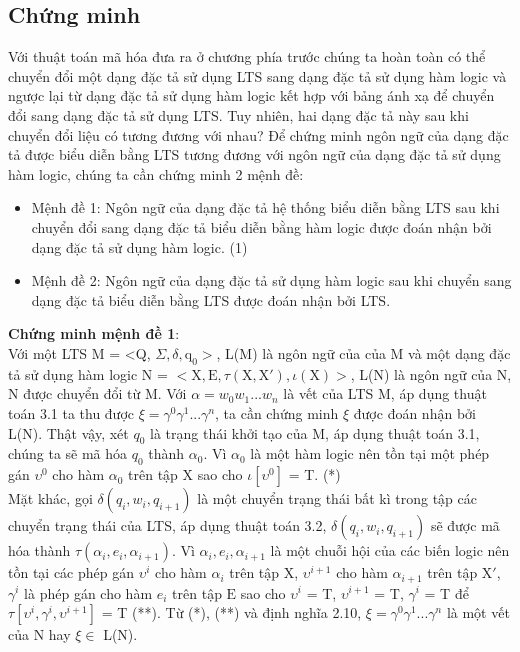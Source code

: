 \documentclass[a4paper,13pt,oneside,openany]{book}
\begin{document}
\begin{flushleft}
		\section{Chứng minh}
		Với thuật toán mã hóa đưa ra ở chương phía trước chúng ta hoàn toàn có thể chuyển đổi một dạng đặc tả sử dụng LTS sang dạng đặc tả sử dụng hàm logic và ngược lại từ dạng đặc tả sử dụng hàm logic kết hợp với bảng ánh xạ để chuyển đổi sang dạng đặc tả sử dụng LTS. Tuy nhiên, hai dạng đặc tả này sau khi chuyển đổi liệu có tương đương với nhau?
		Để chứng minh ngôn ngữ của dạng đặc tả được biểu diễn bằng LTS tương đương với ngôn ngữ của dạng đặc tả sử dụng hàm logic, chúng ta cần chứng minh 2 mệnh đề:
		\begin{itemize}
			\item Mệnh đề 1: Ngôn ngữ của dạng đặc tả hệ thống biểu diễn bằng LTS sau khi chuyển đổi sang dạng đặc tả biểu diễn bằng hàm logic được đoán nhận bởi dạng đặc tả sử dụng hàm logic. (1)\\
			\item Mệnh đề 2: Ngôn ngữ của dạng đặc tả sử dụng hàm logic sau khi chuyển sang dạng đặc tả biểu diễn bằng LTS được đoán nhận bởi LTS.
		\end{itemize}
		\textbf{Chứng minh mệnh đề 1}:\\
		Với một LTS M = <Q, $\Sigma, \delta, \textrm{q}_0>$, L(M) là ngôn ngữ của của M và một dạng đặc tả sử dụng hàm logic N = $<\textrm{X}, \textrm{E}, \tau(\textrm{X}, \textrm{X}'), \iota(\textrm{X})>$, L(N) là ngôn ngữ của N, N được chuyển đổi từ M.
		Với $\alpha = w_0w_1...w_n$ là vết của LTS M, áp dụng thuật toán 3.1 ta thu được $\xi = \gamma^0\gamma^1...\gamma^n$, ta cần chứng minh $\xi$ được đoán nhận bởi L(N). Thật vậy, xét $q_0$ là trạng thái khởi tạo của M, áp dụng thuật toán 3.1, chúng ta sẽ mã hóa $q_0$ thành $\alpha_0$. Vì $\alpha_0$ là một hàm logic nên tồn tại một phép gán $\upsilon^0$ cho hàm $\alpha_0$ trên tập X sao cho $\iota[\upsilon^0]$ = T. (*)\\
		Mặt khác, gọi $\delta(q_i, w_i, q_{i+1})$ là một chuyển trạng thái bất kì trong tập các chuyển trạng thái của LTS, áp dụng thuật toán 3.2, $\delta(q_i, w_i, q_{i+1})$ sẽ được mã hóa thành $\tau(\alpha_i, e_i,  \alpha_{i+1})$. Vì $\alpha_i, e_i, \alpha_{i+1}$ là một chuỗi hội của các biến logic nên tồn tại các phép gán $\upsilon^i$ cho hàm $\alpha_i$ trên tập $\textrm{X}$, $\upsilon^{i+1}$ cho hàm $\alpha_{i+1}$ trên tập $\textrm{X}'$, $\gamma^i$ là phép gán cho hàm $e_i$ trên tập $\textrm{E}$ sao cho $\upsilon^i$ = T, $\upsilon^{i+1}$ = T, $\gamma^i$ = T để $\tau[\upsilon^i, \gamma^i, \upsilon^{i+1}]$ = T (**). Từ (*), (**) và định nghĩa 2.10, $\xi = \gamma^0\gamma^1...\gamma^n$ là một vết của N hay $\xi \in$ L(N).\\

\end{flushleft}
\end{document}
